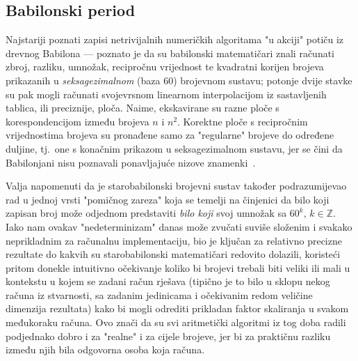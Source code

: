 \documentclass[12pt]{scrartcl}
\begin{document}
\subsection{Babilonski period}

Najstariji poznati zapisi netrivijalnih numeričkih algoritama "u akciji" potiču iz drevnog Babilona --- poznato
 je da su babilonski matematičari znali računati zbroj, razliku, umnožak, recipročnu vrijednost te kvadratni korijen brojeva prikazanih
u \emph{seksagezimalnom} (baza $60$) brojevnom sustavu; potonje dvije stavke su pak mogli računati svojevrsnom linearnom interpolacijom iz
sastavljenih tablica, ili preciznije, ploča. Naime, ekskavirane su razne ploče s korespondencijom između brojeva $n$ i $n^2$. Korektne ploče s
recipročnim vrijednostima brojeva su pronađene samo za "regularne" brojeve do određene duljine, tj.\ one s konačnim prikazom u seksagezimalnom sustavu, jer
se čini da Babilonjani nisu poznavali ponavljajuće nizove znamenki~\cite{KnuthBabylon}.

Valja napomenuti da je starobabilonski brojevni sustav
također podrazumijevao rad u jednoj vrsti "pomičnog zareza" koja se temelji na činjenici da bilo koji zapisan broj može odjednom predstaviti
\emph{bilo koji} svoj umnožak sa $60^k,\,k\in\mathbb{Z}$. Iako nam ovakav "nedeterminizam" danas može zvučati suviše složenim i svakako
neprikladnim za računalnu implementaciju, bio je ključan za relativno precizne rezultate do kakvih su starobabilonski matematičari redovito
dolazili, koristeći pritom donekle intuitivno očekivanje koliko bi brojevi trebali biti veliki ili mali u kontekstu u kojem se zadani račun rješava
(tipično je to bilo u sklopu nekog računa iz stvarnosti, sa zadanim jedinicama i očekivanim redom veličine dimenzija rezultata) kako bi mogli odrediti
prikladan faktor skaliranja u svakom međukoraku računa. Ovo znači da su svi aritmetički algoritmi iz tog doba radili podjednako dobro i za 
"realne" i za cijele brojeve, jer bi za praktičnu razliku između njih bila odgovorna osoba koja računa.
\end{document}
